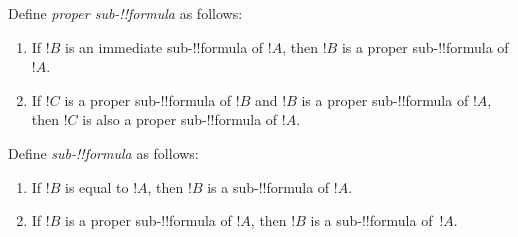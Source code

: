 \documentclass[../../include/open-logic-section]{subfiles}
\begin{document}
\begin{defn}
Define \emph{proper sub-!!{formula}} as follows:
\begin{enumerate}
\item If $!B$ is an immediate sub-!!{formula} of $!A$, then $!B$ is a
  proper sub-!!{formula} of $!A$.
\item If $!C$ is a proper sub-!!{formula} of $!B$ and $!B$ is a proper
  sub-!!{formula} of $!A$, then $!C$ is also a proper sub-!!{formula} of $!A$.
\end{enumerate}
\end{defn}

\begin{defn}
Define \emph{sub-!!{formula}} as follows:
\begin{enumerate}
\item If $!B$ is equal to $!A$, then $!B$ is a sub-!!{formula} of $!A$.
\item If $!B$ is a proper sub-!!{formula} of $!A$, then $!B$ is a
  sub-!!{formula} of~$!A$.
\end{enumerate}
\end{defn}
\end{document}
